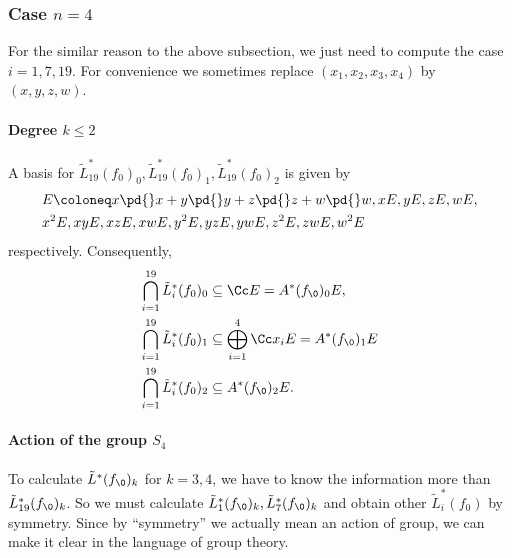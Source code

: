 \subsubsection{Case \texorpdfstring{$n=4$}{n=4}}\label{sec-4.2.4}
For the similar reason to the above subsection, we just need to compute the case $i=1,7,19$. For convenience we sometimes replace $(x_1,x_2,x_3,x_4)$ by $(x,y,z,w)$.

\paragraph{Degree \texorpdfstring{$k\leqslant 2$}{k<=2}}
A basis for $\tilde L^*_{19}(f_0)_0, \tilde L^*_{19}(f_0)_1, \tilde L^*_{19}(f_0)_2$ is given by
\begin{align*}
  &E\coloneq x \pd {} x + y \pd{} y + z\pd{} z+w\pd{}w, xE,yE,zE,wE,\\
  &x^2E,xyE, xz E, xw E,y^2E,
  yzE, ywE, z^2E, zw E, w^2E
\end{align*}
respectively. 	Consequently,
\begin{align*}
  \bigcap_{i=1}^{19} \tilde L^*_i(f_0)_0 
  &\subseteq\Cc E = A^*(f_\0)_0 E,\\
  \bigcap_{i=1}^{19} \tilde L^*_i(f_0)_1
  &\subseteq\bigoplus_{i=1}^4\Cc x_iE = A^*(f_\0)_1 E\\	
  \bigcap_{i=1}^{19} \tilde L^*_i(f_0)_2 
  &\subseteq A^*(f_\0)_2 E.
\end{align*}

\paragraph{Action of the group \texorpdfstring{$S_4$}{S4}}
To calculate $\tilde L^*(f_\0)_k$ for $k=3,4$, we have to know the information more than $\tilde L_{19}^*(f_\0)_k$. So we must calculate $\tilde L_1^*(f_\0)_k, \tilde L_7^*(f_\0)_k$ and obtain other $\tilde L_i^*(f_0)$ by symmetry.  Since by ``symmetry'' we  actually mean an action of group, we can make it clear in the language of group theory. 

